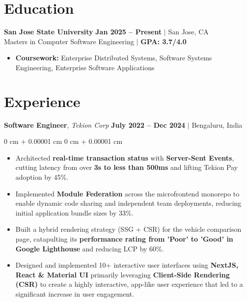 \documentclass[10pt, letterpaper]{article}
\newenvironment{highlights}{
    \begin{itemize}[
        topsep=0.10 cm,     %
        parsep=0.10 cm,     %
        partopsep=0pt,      %
        itemsep=0.03cm,     %
        leftmargin=0 cm + 10pt  %
    ]
}{
    \end{itemize}
}
\newenvironment{onecolentry}{
    \begin{adjustwidth}{
        0 cm + 0.00001 cm
    }{
        0 cm + 0.00001 cm
    }
}{
    \end{adjustwidth}
}
\begin{document}
    \section{Education}
        
        \noindent
        \textbf{San Jose State University} \hfill {\color{darkgray}\small{\textbf{Jan 2025 – Present} $|$ San Jose, CA}}\\
        {\color{darkgray}Masters in Computer Software Engineering} $|$ \textbf{GPA: 3.7/4.0}
        \begin{highlights}
            \item \textbf{Coursework:} Enterprise Distributed Systems, Software Systems Engineering, Enterprise Software Applications \end{highlights}


    \section{Experience}

        \noindent
        \textbf{Software Engineer}, {\color{darkgray}\textit{Tekion Corp}} \hfill {\color{darkgray}\small{\textbf{July 2022 – Dec 2024} $|$ Bengaluru, India }}

        \vspace{0.20 cm}
        \begin{onecolentry}
            \begin{highlights}
                \item Architected \textbf{real-time transaction status} with \textbf{Server-Sent Events}, cutting latency from over \textbf{3s to less than 500ms} and lifting Tekion Pay adoption by 45\%.
                \item Implemented \textbf{Module Federation} across the microfrontend monorepo to enable dynamic code sharing and independent team deployments, reducing initial application bundle sizes by 33\%.
                \item Built a hybrid rendering strategy (SSG + CSR) for the vehicle comparison page, catapulting its \textbf{performance rating from 'Poor' to 'Good' in Google Lighthouse} and reducing LCP by 60\%.
                \item Designed and implemented 10+ interactive user interfaces using \textbf{NextJS, React \& Material UI} primarily leveraging \textbf{Client-Side Rendering (CSR)} to create a highly interactive, app-like user experience that led to a significant increase in user engagement.
            \end{highlights}
        \end{onecolentry}
\end{document}
